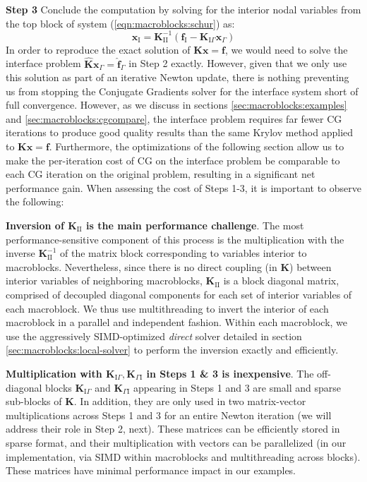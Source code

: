 \noindent\textbf{Step 3} Conclude the computation by solving for the
interior nodal variables from the top block of system
(\ref{eqn:macroblocks:schur}) as:
\begin{equation}
\mathbf{x}_{\mathrm{I}}=\mathbf{K}_{\mathrm{I}\mathrm{I}}^{-1}\left(\mathbf{f}_{\mathrm{I}}-\mathbf{K}_{\mathrm{I}\Gamma}\mathbf{x}_{\Gamma}\right)
\label{eqn:macroblocks:GammatoI}
\end{equation}
In order to reproduce the exact solution of $\mathbf{Kx=f}$, we would
need to solve the interface problem
$\hat{\mathbf{K}}\mathbf{x}_\Gamma=\hat{\mathbf{f}}_{\Gamma}$ in Step
2 exactly. However, given that we only use this solution as part of an
iterative Newton update, there is nothing preventing us from stopping
the Conjugate Gradients solver for the interface system short of full
convergence. However, as we discuss in sections \ref{sec:macroblocks:examples} and
\ref{sec:macroblocks:cgcompare}, the interface problem requires far fewer CG
iterations to produce good quality results than the same Krylov method
applied to $\mathbf{Kx=f}$. Furthermore, the optimizations of the
following section allow us to make the per-iteration cost of CG on the
interface problem be comparable to each CG iteration on the original
problem, resulting in a significant net performance gain.  When
assessing the cost of Steps 1-3, it is important to observe the
following:

\noindent\textbf{Inversion of $\mathbf{K}_{\mathrm{I}\mathrm{I}}$ is the main performance challenge}. The most performance-sensitive component of this process is
the multiplication with the inverse
$\mathbf{K}_{\mathrm{I}\mathrm{I}}^{-1}$ of the matrix block
corresponding to variables interior to macroblocks. Nevertheless,
since there is no direct coupling (in $\mathbf{K}$) between interior
variables of neighboring macroblocks,
$\mathbf{K}_{\mathrm{I}\mathrm{I}}$ is a block diagonal matrix,
comprised of decoupled diagonal components for each set of interior
variables of each macroblock. We thus use multithreading to invert the
interior of each macroblock in a parallel and independent
fashion. Within each macroblock, we use the aggressively
SIMD-optimized \emph{direct} solver detailed in section
\ref{sec:macroblocks:local-solver} to perform the inversion exactly and
efficiently.

\noindent\textbf{Multiplication with $\mathbf{K}_{\mathrm{I}\Gamma},\mathbf{K}_{\Gamma\mathrm{I}}$ in Steps 1 \& 3 is inexpensive}. The off-diagonal blocks
$\mathbf{K}_{\mathrm{I}\Gamma}$ and $\mathbf{K}_{\Gamma\mathrm{I}}$
appearing in Steps 1 and 3 are small and sparse sub-blocks of
$\mathbf{K}$. In addition, they are only used in two matrix-vector
multiplications across Steps 1 and 3 for an entire Newton iteration
(we will address their role in Step 2, next). These matrices can be
efficiently stored in sparse format, and their multiplication with
vectors can be parallelized (in our implementation, via SIMD within
macroblocks and multithreading across blocks). These matrices have
minimal performance impact in our examples.


